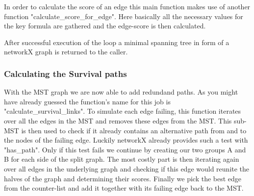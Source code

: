 	In order to calculate the score of an edge this main function makes use of another function "calculate\_score\_for\_edge".
	Here basically all the necessary values for the key formula are gathered and the edge-score is then calculated.
	
	After successful execution of the loop a minimal spanning tree in form of a networkX graph is returned to the caller.
	
      \subsubsection{Calculating the Survival paths}
	With the MST graph we are now able to add redundand paths. As you might have already guessed the function's name for this job is "calculate\_survival\_links".
	To simulate each edge failing, this function iterates over all the edges in the MST and removes these edges from the MST.
	This sub-MST is then used to check if it already contains an alternative path from and to the nodes of the failing edge.
	Luckily networkX already provides such a test with "has\_path". Only if this test fails we continue by creating our two groups A and B for each side of the split graph.
	The most costly part is then iterating again over all edges in the underlying graph and checking if this edge would reunite the halves of the graph and determining 
	their scores. Finally we pick the best edge from the counter-list and add it together with its failing edge back to the MST.
	
